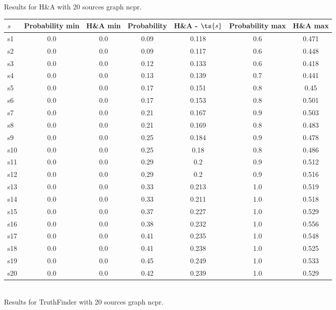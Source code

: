 \documentclass{article}
\begin{document}
\noindent Results for H\&A with 20 sources graph ncpr.

\noindent\begin{tabular}{|l|c|c|c|c|c|c|}
\hline
$s$& Probability min & H\&A min & Probability & H\&A - $\ts{s}$ & Probability max & H\&A max\\
\hline
s1 &0.0 & 0.0 & 0.09 & 0.118 & 0.6 & 0.471\\
\hline
s2 &0.0 & 0.0 & 0.09 & 0.117 & 0.6 & 0.448\\
\hline
s3 &0.0 & 0.0 & 0.12 & 0.133 & 0.6 & 0.418\\
\hline
s4 &0.0 & 0.0 & 0.13 & 0.139 & 0.7 & 0.441\\
\hline
s5 &0.0 & 0.0 & 0.17 & 0.151 & 0.8 & 0.45\\
\hline
s6 &0.0 & 0.0 & 0.17 & 0.153 & 0.8 & 0.501\\
\hline
s7 &0.0 & 0.0 & 0.21 & 0.167 & 0.9 & 0.503\\
\hline
s8 &0.0 & 0.0 & 0.21 & 0.169 & 0.8 & 0.483\\
\hline
s9 &0.0 & 0.0 & 0.25 & 0.184 & 0.9 & 0.478\\
\hline
s10 &0.0 & 0.0 & 0.25 & 0.18 & 0.8 & 0.486\\
\hline
s11 &0.0 & 0.0 & 0.29 & 0.2 & 0.9 & 0.512\\
\hline
s12 &0.0 & 0.0 & 0.29 & 0.2 & 0.9 & 0.516\\
\hline
s13 &0.0 & 0.0 & 0.33 & 0.213 & 1.0 & 0.519\\
\hline
s14 &0.0 & 0.0 & 0.33 & 0.211 & 1.0 & 0.518\\
\hline
s15 &0.0 & 0.0 & 0.37 & 0.227 & 1.0 & 0.529\\
\hline
s16 &0.0 & 0.0 & 0.38 & 0.232 & 1.0 & 0.556\\
\hline
s17 &0.0 & 0.0 & 0.41 & 0.235 & 1.0 & 0.548\\
\hline
s18 &0.0 & 0.0 & 0.41 & 0.238 & 1.0 & 0.525\\
\hline
s19 &0.0 & 0.0 & 0.45 & 0.249 & 1.0 & 0.533\\
\hline
s20 &0.0 & 0.0 & 0.42 & 0.239 & 1.0 & 0.529\\
\hline
\end{tabular}\\

\noindent Results for TruthFinder with 20 sources graph ncpr.
\end{document}
